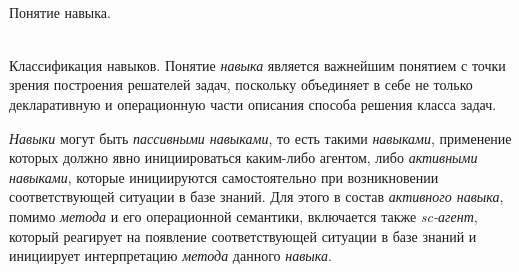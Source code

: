 \begin{frame}{\\Понятие навыка.}
	\topline
	\justifying
        \begin{SCn}
        \end{SCn}
\end{frame}

\begin{frame}{\\Классификация навыков.}
	\topline
	\justifying
Понятие \textit{навыка} является важнейшим понятием с точки зрения построения решателей задач, поскольку объединяет в себе не только декларативную и операционную части описания способа решения класса задач.

\textit{Навыки} могут быть \textit{пассивными навыками}, то есть такими \textit{навыками}, применение которых должно явно инициироваться каким-либо агентом, либо \textit{активными навыками}, которые инициируются самостоятельно при возникновении соответствующей ситуации в базе знаний. Для этого в состав \textit{активного навыка}, помимо \textit{метода} и его операционной семантики, включается также \textit{sc-агент}, который реагирует на появление соответствующей ситуации в базе знаний и инициирует интерпретацию \textit{метода} данного \textit{навыка}.
\end{frame}


